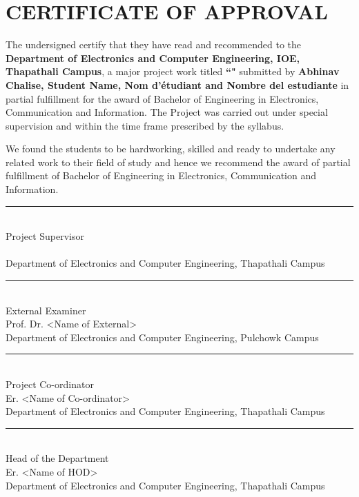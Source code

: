 \documentclass{ioereport}
\begin{document}
    \pagebreak

\section*{CERTIFICATE OF APPROVAL}
    The undersigned certify that they have read and recommended to the \textbf{Department of Electronics and Computer Engineering, IOE, Thapathali Campus}, a major project work titled \textbf{``\titlename"} submitted by \textbf{Abhinav Chalise, Student Name, Nom d'étudiant and Nombre del estudiante} in partial fulfillment for the award of Bachelor of Engineering in Electronics, Communication and Information. The Project was carried out under special supervision and within the time frame prescribed by the syllabus.
    
    We found the students to be hardworking, skilled and ready to undertake any related work to their field of study and hence we recommend the award of partial fulfillment of Bachelor of Engineering in Electronics, Communication and Information. \\
    
    \rule{0.5\linewidth}{0.4pt}\\
    Project Supervisor\\
    \supervisorname\\
    Department of Electronics and Computer Engineering, Thapathali Campus\\

    \rule{0.5\linewidth}{0.4pt} \\
    External Examiner \\
    Prof. Dr. \textless Name of External\textgreater\\
    Department of Electronics and Computer Engineering, Pulchowk Campus\\

    \rule{0.5\linewidth}{0.4pt} \\
    Project Co-ordinator\\
    Er. \textless Name of Co-ordinator\textgreater \\
    Department of Electronics and Computer Engineering, Thapathali Campus\\

    \rule{0.5\linewidth}{0.4pt} \\
    Head of the Department \\ 
    Er. \textless Name of HOD\textgreater \\ 
    Department of Electronics and Computer Engineering, Thapathali Campus\\
\end{document}
